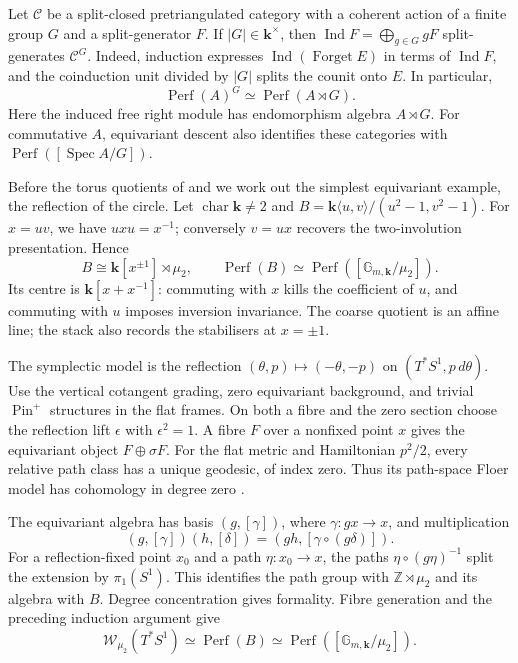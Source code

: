 \documentclass[a4paper]{amsart}
\newcommand{\kk}{\mathbf{k}}
\newcommand{\ZZ}{\mathbb{Z}}
\DeclareMathOperator{\Perf}{Perf}
\numberwithin{equation}{section}
\begin{document}
Let $\mathcal C$ be a split-closed pretriangulated category with
a coherent action of a finite group $G$ and a split-generator $F$.
If $|G|\in\kk^\times$, then
$\operatorname{Ind}F=\bigoplus_{g\in G}gF$ split-generates
$\mathcal C^G$. Indeed, induction expresses
$\operatorname{Ind}(\operatorname{Forget}E)$ in terms of
$\operatorname{Ind}F$, and the coinduction unit divided by $|G|$
splits the counit onto $E$. In particular,
\begin{equation}\label{eq:equivariant-perfect}
 \Perf(A)^G\simeq\Perf(A\rtimes G).
\end{equation}
Here the induced free right module has endomorphism algebra
$A\rtimes G$. For commutative $A$, equivariant descent also
identifies these categories with $\Perf([\operatorname{Spec}A/G])$.

Before the torus quotients of  and
 we work out the simplest equivariant example,
the reflection of the circle.
Let $\operatorname{char}\kk\ne2$ and
$B=\kk\langle u,v\rangle/(u^2-1,v^2-1)$.
For $x=uv$, we have $uxu=x^{-1}$; conversely $v=ux$ recovers
the two-involution presentation. Hence
\begin{equation}\label{eq:involution-algebra}
 B\cong\kk[x^{\pm1}]\rtimes\mu_2,\qquad
 \Perf(B)\simeq\Perf([\mathbb G_{m,\kk}/\mu_2]).
\end{equation}
Its centre is $\kk[x+x^{-1}]$: commuting with $x$ kills the
coefficient of $u$, and commuting with $u$ imposes inversion
invariance. The coarse quotient is an affine line; the stack
also records the stabilisers at $x=\pm1$.

The symplectic model is the reflection
$(\theta,p)\mapsto(-\theta,-p)$ on $(T^*S^1,p\,d\theta)$.
Use the vertical cotangent grading, zero equivariant background,
and trivial $\operatorname{Pin}^+$ structures in the flat frames.
On both a fibre and the zero section choose the reflection lift
$\epsilon$ with $\epsilon^2=1$. A fibre $F$ over a nonfixed
point $x$ gives the equivariant object $F\oplus\sigma F$.
For the flat metric and Hamiltonian $p^2/2$, every relative path
class has a unique geodesic, of index zero. Thus its path-space
Floer model has cohomology in degree zero
\cite{AbouzaidFibre,AbouzaidLoops}.

The equivariant algebra has basis $(g,[\gamma])$, where
$\gamma:gx\to x$, and multiplication
\[
 (g,[\gamma])(h,[\delta])=(gh,[\gamma\circ(g\delta)]).
\]
For a reflection-fixed point $x_0$ and a path $\eta:x_0\to x$,
the paths $\eta\circ(g\eta)^{-1}$ split the extension by
$\pi_1(S^1)$. This identifies the path group with $\ZZ\rtimes\mu_2$
and its algebra with $B$. Degree concentration gives formality.
Fibre generation and the preceding induction argument give
\[
 \mathcal W_{\mu_2}(T^*S^1)\simeq\Perf(B)
       \simeq\Perf([\mathbb G_{m,\kk}/\mu_2]).
\]
\end{document}

